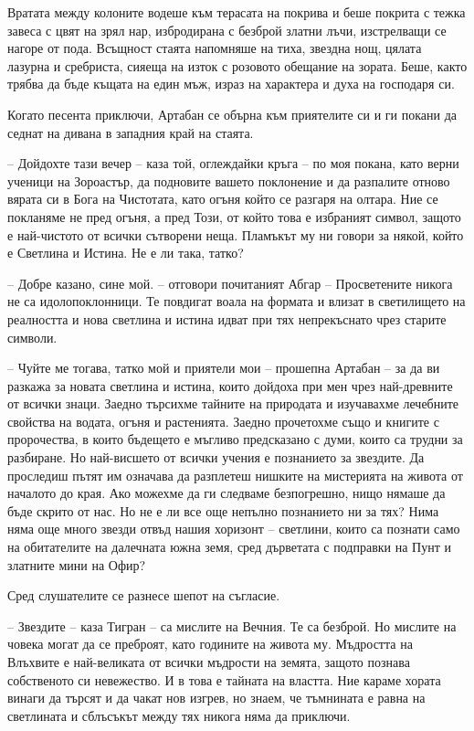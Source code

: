 Вратата между колоните водеше към терасата на покрива и беше покрита с тежка
завеса с цвят на зрял нар, избродирана с безброй златни лъчи, изстрелващи се
нагоре от пода. Всъщност стаята напомняше на тиха, звездна нощ, цялата лазурна и
сребриста, сияеща на изток с розовото обещание на зората. Беше, както трябва да
бъде къщата на един мъж, израз на характера и духа на господаря си.

Когато песента приключи, Артабан се обърна към приятелите си и ги покани да
седнат на дивана в западния край на стаята.

-- Дойдохте тази вечер -- каза той, оглеждайки кръга -- по моя покана, като
верни ученици на Зороастър, да подновите вашето поклонение и да разпалите отново
вярата си в Бога на Чистотата, като огъня който се разгаря на олтара. Ние се
покланяме не пред огъня, а пред Този, от който това е избраният символ, защото е
най-чистото от всички сътворени неща. Пламъкът му ни говори за някой, който е
Светлина и Истина. Не е ли така, татко?

-- Добре казано, сине мой. -- отговори почитаният Абгар -- Просветените никога
не са идолопоклонници. Те повдигат воала на формата и влизат в светилището на
реалността и нова светлина и истина идват при тях непрекъснато чрез старите
символи.

-- Чуйте ме тогава, татко мой и приятели мои -- прошепна Артабан -- за да ви
разкажа за новата светлина и истина, които дойдоха при мен чрез най-древните от
всички знаци. Заедно търсихме тайните на природата и изучавахме лечебните
свойства на водата, огъня и растенията. Заедно прочетохме също и книгите с
пророчества, в които бъдещето е мъгливо предсказано с думи, които са трудни за
разбиране. Но най-висшето от всички учения е познанието за звездите. Да
проследиш пътят им означава да разплетеш нишките на мистерията на живота от
началото до края. Ако можехме да ги следваме безпогрешно, нищо нямаше да бъде
скрито от нас. Но не е ли все още непълно познанието ни за тях? Нима няма още
много звезди отвъд нашия хоризонт -- светлини, които са познати само на
обитателите на далечната южна земя, сред дърветата с подправки на Пунт и
златните мини на Офир?

Сред слушателите се разнесе шепот на съгласие.

-- Звездите -- каза Тигран -- са мислите на Вечния. Те са безброй. Но мислите на
човека могат да се преброят, като годините на живота му. Мъдростта на Влъхвите е
най-великата от всички мъдрости на земята, защото познава собственото си
невежество. И в това е тайната на властта. Ние караме хората винаги да търсят и
да чакат нов изгрев, но знаем, че тъмнината е равна на светлината и сблъсъкът
между тях никога няма да приключи.

